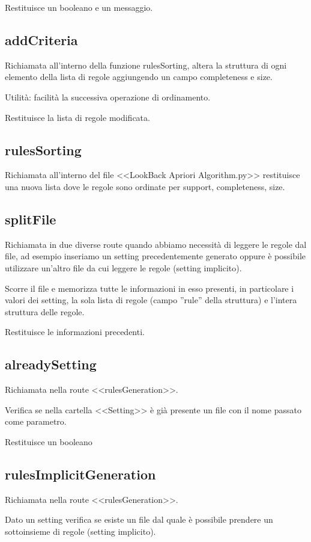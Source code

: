 \documentclass[a4paper]{article}
\begin{document}
Restituisce un booleano e un messaggio.

\subsection{addCriteria}
Richiamata all'interno della funzione rulesSorting, altera la struttura di ogni elemento della lista di regole aggiungendo un campo completeness e size.

Utilità: facilità la successiva operazione di ordinamento.

Restituisce la lista di regole modificata.

\subsection{rulesSorting}
Richiamata all'interno del file <<LookBack Apriori Algorithm.py>> restituisce una nuova lista dove le regole sono ordinate per support, completeness, size.

\subsection{splitFile}
Richiamata in due diverse route quando abbiamo necessità di leggere le regole dal file, ad esempio inseriamo un setting precedentemente generato oppure è possibile utilizzare un'altro file da cui leggere le regole (setting implicito).

Scorre il file e memorizza tutte le informazioni in esso presenti, in particolare i valori dei setting, la sola lista di regole (campo ''rule'' della struttura) e l'intera struttura delle regole.

Restituisce le informazioni precedenti.

\subsection{alreadySetting}
Richiamata nella route <<rulesGeneration>>.

Verifica se nella cartella <<Setting>> è già presente un file con il nome passato come parametro.

Restituisce un booleano

\subsection{rulesImplicitGeneration}
Richiamata nella route <<rulesGeneration>>.

Dato un setting verifica se esiste un file  dal quale è possibile prendere un sottoinsieme di regole (setting implicito).
\end{document}
